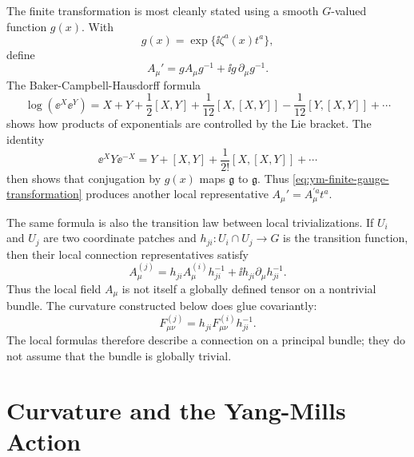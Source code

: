 The finite transformation is most cleanly stated using a smooth
\(G\)-valued function \(g(x)\).  With
\[
  g(x)=\exp\{\ii\zeta^a(x)t^a\},
\]
define
\begin{equation}
  A_\mu'
  =
  gA_\mu g^{-1}+\ii g\,\partial_\mu g^{-1}.
  \label{eq:ym-finite-gauge-transformation}
\end{equation}
The Baker-Campbell-Hausdorff formula
\[
  \log(\ee^X\ee^Y)
  =
  X+Y+\frac12[X,Y]
  +\frac1{12}[X,[X,Y]]
  -\frac1{12}[Y,[X,Y]]+\cdots
\]
shows how products of exponentials are controlled by the Lie bracket.  The
identity
\[
  \ee^X Y\ee^{-X}
  =
  Y+[X,Y]+\frac1{2!}[X,[X,Y]]+\cdots
\]
then shows that conjugation by \(g(x)\) maps \(\mathfrak g\) to
\(\mathfrak g\).  Thus \eqref{eq:ym-finite-gauge-transformation} produces
another local representative \(A_\mu'=A_\mu^{\prime a}t^a\).

The same formula is also the transition law between local trivializations.
If \(U_i\) and \(U_j\) are two coordinate patches and
\(h_{ji}:U_i\cap U_j\to G\) is the transition function, then their local
connection representatives satisfy
\[
  A_\mu^{(j)}
  =
  h_{ji}A_\mu^{(i)}h_{ji}^{-1}
  +\ii h_{ji}\partial_\mu h_{ji}^{-1}.
\]
Thus the local field \(A_\mu\) is not itself a globally defined tensor on a
nontrivial bundle.  The curvature constructed below does glue covariantly:
\[
  F_{\mu\nu}^{(j)}=h_{ji}F_{\mu\nu}^{(i)}h_{ji}^{-1}.
\]
The local formulas therefore describe a connection on a principal bundle; they
do not assume that the bundle is globally trivial.

\section{Curvature and the Yang-Mills Action}


